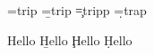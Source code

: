
\font\a=trip
\font\b=trip  %
\font\c=tripp %
\font\d=trap  %

\a Hello
\b Hello
\c Hello
\d Hello

\bye
